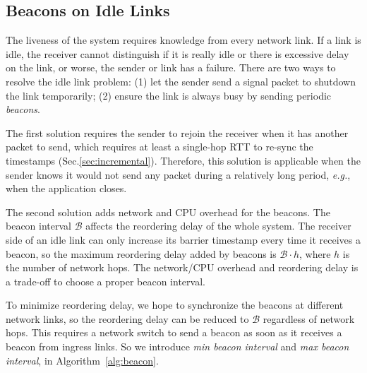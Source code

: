 \subsection{Beacons on Idle Links}
\label{sec:beacon}

The liveness of the system requires knowledge from every network link. If a link is idle, the receiver cannot distinguish if it is really idle or there is excessive delay on the link, or worse, the sender or link has a failure. There are two ways to resolve the idle link problem: (1) let the sender send a signal packet to shutdown the link temporarily; (2) ensure the link is always busy by sending periodic \textit{beacons}.

The first solution requires the sender to rejoin the receiver when it has another packet to send, which requires at least a single-hop RTT to re-sync the timestamps (Sec.\ref{sec:incremental}). Therefore, this solution is applicable when the sender knows it would not send any packet during a relatively long period, \textit{e.g.}, when the application closes.

The second solution adds network and CPU overhead for the beacons. The beacon interval $\mathcal{B}$ affects the reordering delay of the whole system. The receiver side of an idle link can only increase its barrier timestamp every time it receives a beacon, so the maximum reordering delay added by beacons is $\mathcal{B} \cdot h$, where $h$ is the number of network hops. The network/CPU overhead and reordering delay is a trade-off to choose a proper beacon interval.

To minimize reordering delay, we hope to synchronize the beacons at different network links, so the reordering delay can be reduced to $\mathcal{B}$ regardless of network hops. This requires a network switch to send a beacon as soon as it receives a beacon from ingress links. So we introduce \textit{min beacon interval} and \textit{max beacon interval}, in Algorithm~\ref{alg:beacon}.


